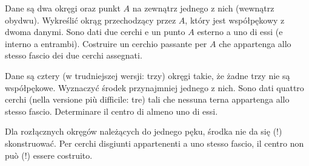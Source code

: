 \begin{geoconstruction}
    Dane są dwa okręgi oraz punkt $A$ na zewnątrz jednego z nich (wewnątrz obydwu). %
    Wykreślić okrąg przechodzący przez $A$, który jest współpękowy z dwoma danymi. %
    Sono dati due cerchi e un punto $A$ esterno a uno di essi (e interno a entrambi). %
    Costruire un cerchio passante per $A$ che appartenga allo stesso fascio dei due cerchi assegnati. %
\end{geoconstruction}

\begin{geoconstruction}
\label{delta_2024_12_end}%
    Dane są cztery (w trudniejszej wersji: trzy) okręgi takie, że żadne trzy nie są współpękowe. %
    Wyznaczyć środek przynajmniej jednego z nich. %
    Sono dati quattro cerchi (nella versione più difficile: tre) tali che nessuna terna appartenga allo stesso fascio. %
    Determinare il centro di almeno uno di essi. %
\end{geoconstruction}

Dla rozłącznych okręgów należących do jednego pęku, środka nie da się (!) skonstruować. %
Per cerchi disgiunti appartenenti a uno stesso fascio, il centro non può (!) essere costruito. %

%